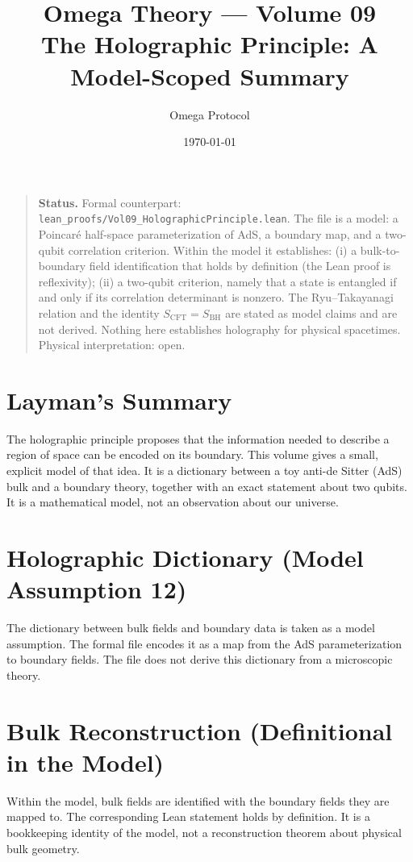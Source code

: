 \documentclass[11pt, a4paper]{article}
\title{Omega Theory --- Volume 09\\\Large The Holographic Principle: A Model-Scoped Summary}
\author{Omega Protocol}
\date{\today}
\begin{document}
\maketitle

\begin{quote}
\textbf{Status.} Formal counterpart: \texttt{lean\_proofs/Vol09\_HolographicPrinciple.lean}. The file is a model: a Poincar\'e half-space parameterization of AdS, a boundary map, and a two-qubit correlation criterion. Within the model it establishes: (i) a bulk-to-boundary field identification that holds by definition (the Lean proof is reflexivity); (ii) a two-qubit criterion, namely that a state is entangled if and only if its correlation determinant is nonzero. The Ryu--Takayanagi relation and the identity $S_{\text{CFT}} = S_{\text{BH}}$ are stated as model claims and are not derived. Nothing here establishes holography for physical spacetimes. Physical interpretation: open.
\end{quote}

\section*{Layman's Summary}
The holographic principle proposes that the information needed to describe a region of space can be encoded on its boundary. This volume gives a small, explicit model of that idea. It is a dictionary between a toy anti-de Sitter (AdS) bulk and a boundary theory, together with an exact statement about two qubits. It is a mathematical model, not an observation about our universe.

\section{Holographic Dictionary (Model Assumption 12)}
The dictionary between bulk fields and boundary data is taken as a model assumption. The formal file encodes it as a map from the AdS parameterization to boundary fields. The file does not derive this dictionary from a microscopic theory.

\section{Bulk Reconstruction (Definitional in the Model)}
Within the model, bulk fields are identified with the boundary fields they are mapped to. The corresponding Lean statement holds by definition. It is a bookkeeping identity of the model, not a reconstruction theorem about physical bulk geometry.
\end{document}
